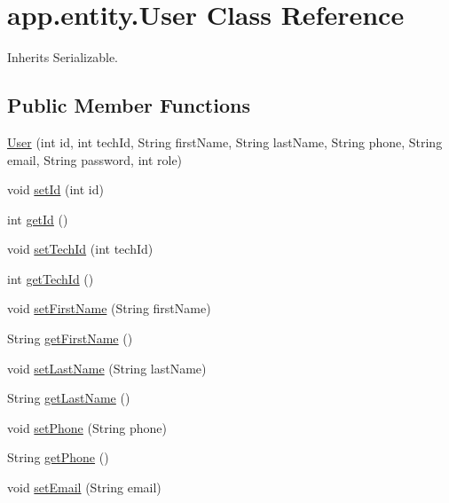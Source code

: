 \hypertarget{classapp_1_1entity_1_1_user}{}\section{app.\+entity.\+User Class Reference}
\label{classapp_1_1entity_1_1_user}


Inherits Serializable.

\subsection*{Public Member Functions}
\begin{DoxyCompactItemize}
\item 
\mbox{\hyperlink{classapp_1_1entity_1_1_user_a9fe2b021a040bb9042856de4c2ef7dd2}{User}} (int id, int tech\+Id, String first\+Name, String last\+Name, String phone, String email, String password, int role)
\item 
void \mbox{\hyperlink{classapp_1_1entity_1_1_user_a4a8c0d9f2b5e71c358252968d1cc6e50}{set\+Id}} (int id)
\item 
int \mbox{\hyperlink{classapp_1_1entity_1_1_user_a8a90b4368d45d1e983b103798f309ced}{get\+Id}} ()
\item 
void \mbox{\hyperlink{classapp_1_1entity_1_1_user_ab50ff650450c4e30fd09717de9b8f74b}{set\+Tech\+Id}} (int tech\+Id)
\item 
int \mbox{\hyperlink{classapp_1_1entity_1_1_user_a02c8353d6858b839770ddcb0d1bb421a}{get\+Tech\+Id}} ()
\item 
void \mbox{\hyperlink{classapp_1_1entity_1_1_user_a0ba9ca1e71cfcfdc6139b9fe102ced5d}{set\+First\+Name}} (String first\+Name)
\item 
String \mbox{\hyperlink{classapp_1_1entity_1_1_user_abcc62bde9e1bae566914365ca2eb1e5d}{get\+First\+Name}} ()
\item 
void \mbox{\hyperlink{classapp_1_1entity_1_1_user_a4ebc3f3fc0d5c63bd337764ce94f319a}{set\+Last\+Name}} (String last\+Name)
\item 
String \mbox{\hyperlink{classapp_1_1entity_1_1_user_a342467edf8f8b70770f8cdb00f084044}{get\+Last\+Name}} ()
\item 
void \mbox{\hyperlink{classapp_1_1entity_1_1_user_aefe0c9ee87b30227cff5d378ddbc53c2}{set\+Phone}} (String phone)
\item 
String \mbox{\hyperlink{classapp_1_1entity_1_1_user_a889c34f5c122dcc41694df9553095102}{get\+Phone}} ()
\item 
void \mbox{\hyperlink{classapp_1_1entity_1_1_user_ad3c508983e8cf0ecbb5fa8158671945c}{set\+Email}} (String email)

\end{DoxyCompactItemize}
